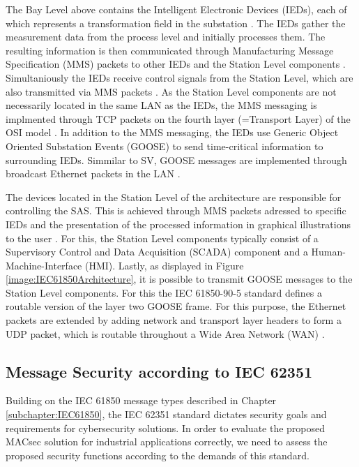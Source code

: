 \documentclass[conference]{IEEEtran}
\begin{document}
\smallskip
The Bay Level above contains the Intelligent Electronic Devices (IEDs), each of which represents a transformation field in the substation 
\cite[p. 39]{IEC61850-7-1:2011}. The IEDs gather the measurement data from the process level and initially processes them. The resulting information 
is then communicated through Manufacturing Message Specification (MMS) packets to other IEDs and the Station Level components \cite[p. 44]{IEC61850-8-1:2011}. 
Simultaniously the IEDs receive control signals from the Station Level, which are also transmitted via MMS packets \cite{trafficGen_IEC61850:2011}. 
As the Station Level components are not necessarily located in the same LAN as the IEDs, the MMS messaging is implmented through TCP packets on the 
fourth layer (=Transport Layer) of the OSI model \cite[p. 45]{IEC61850-8-1:2011}. In addition to the MMS messaging, the IEDs use Generic Object Oriented 
Substation Events (GOOSE) to send time-critical information to surrounding IEDs. Simmilar to SV, GOOSE messages are implemented through broadcast 
Ethernet packets in the LAN \cite{GOOSE_confidentiality_integrity:2020}.

\smallskip
The devices located in the Station Level of the architecture are responsible for controlling the SAS. This is achieved through MMS packets adressed 
to specific IEDs and the presentation of the processed information in graphical illustrations to the user \cite{SGRWin_IEC61850Architecture:2021}. 
For this, the Station Level components typically consist of a Supervisory Control and Data Acquisition (SCADA) component and a Human-Machine-Interface 
(HMI). Lastly, as displayed in Figure \ref{image:IEC61850Architecture}, it is possible to transmit GOOSE messages to the Station Level components. 
For this the IEC 61850-90-5 standard \cite{IEC61850-90-5:2012} defines a routable version of the layer two GOOSE frame. For this purpose, the Ethernet 
packets are extended by adding network and transport layer headers to form a UDP packet, which is routable throughout a Wide Area Network (WAN) 
\cite{routable_GOOSE_SV:2020}.

\subsection{Message Security according to IEC 62351}
\noindent Building on the IEC 61850 message types described in Chapter \ref{subchapter:IEC61850}, the IEC 62351 standard \cite{IEC62351:2024} dictates 
security goals and requirements for cybersecurity solutions. In order to evaluate the proposed MACsec solution for industrial applications correctly, 
we need to assess the proposed security functions according to the demands of this standard.
\end{document}
